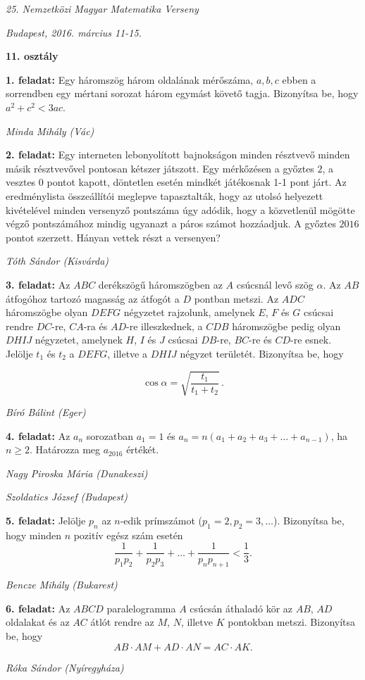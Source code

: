 \documentclass[a4paper,10pt]{article}
\newcommand{\ki}[2]{\hfill {\it #1 (#2)}\medskip}
\begin{document}
\begin{center} \Large {\em 25. Nemzetközi Magyar Matematika Verseny} \end{center}
\begin{center} \large{\em Budapest, 2016. március 11-15.} \end{center}
\smallskip
\begin{center} \large{\bf 11. osztály} \end{center}
\bigskip 

{\bf 1. feladat: } Egy háromszög három oldalának mérőszáma, $a,b,c$ ebben a sorrendben egy mértani sorozat három egymást követő tagja. Bizonyítsa be, hogy $a^2+c^2<3ac$.

\ki{Minda Mihály}{Vác}\medskip

{\bf 2. feladat: } Egy interneten lebonyolított bajnokságon minden
résztvevő minden másik résztvevővel pontosan kétszer játszott. Egy
mérkőzésen a győztes $2$, a vesztes 0 pontot kapott, döntetlen esetén
mindkét játékosnak 1-1 pont járt. Az eredménylista összeállítói meglepve 
tapasztalták,
hogy az utolsó helyezett kivételével minden versenyző pontszáma úgy
adódik, hogy a közvetlenül mögötte végző pontszámához mindig ugyanazt a
páros számot hozzáadjuk. A győztes $2016$ pontot szerzett. Hányan vettek
részt a versenyen? 

\ki{Tóth Sándor}{Kisvárda}\medskip

{\bf 3. feladat: } Az $ABC$ derékszögű háromszögben az $A$ csúcsnál levő szög $\alpha$. Az $AB$ átfogóhoz tartozó magasság az átfogót a $D$ pontban metszi. Az $ADC$ háromszögbe olyan $DEFG$ négyzetet rajzolunk, amelynek $E$, $F$ és $G$ csúcsai rendre $DC$-re, $CA$-ra és $AD$-re illeszkednek, a $CDB$ háromszögbe pedig olyan $DHIJ$ négyzetet, amelynek $H$, $I$ és $J$ csúcsai $DB$-re, $BC$-re és $CD$-re esnek. Jelölje $t_1$ és $t_2$ a $DEFG$, illetve a $DHIJ$ négyzet területét. Bizonyítsa be, hogy 

\[\cos\alpha =\sqrt{\frac{t_1}{t_1+t_2}}\,.\]

\ki{Bíró Bálint}{Eger}\medskip

{\bf 4. feladat: } Az $a_n$ sorozatban $a_1=1$ és $a_n=n\left(a_1+a_2+a_3+\ldots+a_{n-1}\right)$, ha $n \geq 2$. Határozza meg $a_{2016}$ értékét.

\ki{Nagy Piroska Mária}{Dunakeszi}

\ki{Szoldatics József}{Budapest}\medskip

{\bf 5. feladat: } Jelölje $p_n$ az $n$-edik prímszámot ($p_1=2, p_2=3, \dots$). Bizonyítsa be, hogy minden $n$ pozitív egész szám esetén
\[\frac{1}{p_1p_2}+\frac1{p_2p_3}+\ldots+\frac{1}{p_np_{n+1}}<\frac13.\]

\ki{Bencze Mihály}{Bukarest}\medskip

{\bf 6. feladat: } Az $ABCD$ paralelogramma $A$ csúcsán áthaladó kör az $AB$, $AD$ oldalakat és az $AC$ átlót rendre az $M$, $N$, illetve $K$ pontokban metszi. Bizonyítsa be, hogy 
\[AB\cdot AM + AD\cdot AN = AC\cdot AK.\]

\ki{Róka Sándor}{Nyíregyháza}\medskip
\end{document}
